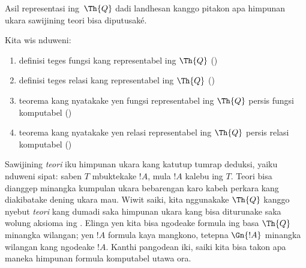 \documentclass[../../../include/open-logic-section]{subfiles}
\begin{document}


\begin{editorial}
Asil representasi ing~$\Th{Q}$ dadi landhesan kanggo pitakon apa himpunan ukara sawijining teori bisa diputusaké.
\end{editorial}

Kita wis nduweni:
\begin{enumerate}
\item definisi teges fungsi kang representabel ing
  $\Th{Q}$ ()
\item definisi teges relasi kang representabel ing
  $\Th{Q}$ ()
\item teorema kang nyatakake yen fungsi representabel ing $\Th{Q}$
  persis fungsi komputabel
  ()
\item teorema kang nyatakake yen relasi representabel ing $\Th{Q}$
  persis relasi komputabel
  ()
\end{enumerate}

Sawijining {\em teori} iku himpunan ukara kang katutup tumrap deduksi,
yaiku nduweni sipat: saben $T$ mbuktekake $!A$, mula $!A$ kalebu ing
$T$. Teori bisa dianggep minangka kumpulan ukara bebarengan karo
kabeh perkara kang diakibatake dening ukara mau. Wiwit saiki, kita
nggunakake $\Th{Q}$ kanggo nyebut {\em teori} kang dumadi saka
himpunan ukara kang bisa diturunake saka wolung aksioma ing
. Elinga yen kita bisa ngodeake formula
ing basa $\Th{Q}$ minangka wilangan; yen $!A$ formula kaya mangkono,
tetepna $\Gn{!A}$ minangka wilangan kang ngodeake $!A$.
Kanthi pangodean iki, saiki kita bisa takon apa maneka himpunan
formula komputabel utawa ora.
\end{document}
